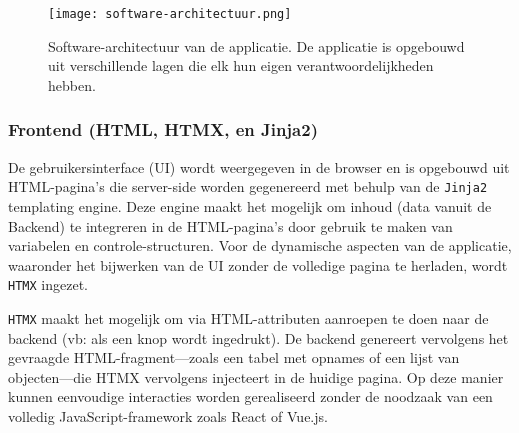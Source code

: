 \begin{figure}[H]
  \centering
  \texttt{[image: software-architectuur.png]}
  \caption[]{\label{fig:software-architectuur} Software-architectuur van de applicatie. De applicatie is opgebouwd uit verschillende lagen die elk hun eigen verantwoordelijkheden hebben. }
\end{figure}

\subsubsection{Frontend (HTML, HTMX, en Jinja2)}

De gebruikersinterface (UI) wordt weergegeven in de browser en is opgebouwd uit HTML-pagina's die server-side worden gegenereerd met behulp van de \texttt{Jinja2} templating engine.
Deze engine maakt het mogelijk om inhoud (data vanuit de Backend) te integreren in de HTML-pagina's door gebruik te maken van variabelen en controle-structuren.
Voor de dynamische aspecten van de applicatie, waaronder het bijwerken van de UI zonder de volledige pagina te herladen, wordt \texttt{HTMX} ingezet.

\texttt{HTMX} maakt het mogelijk om via HTML-attributen aanroepen te doen naar de backend (vb: als een knop wordt ingedrukt).
De backend genereert vervolgens het gevraagde HTML-fragment---zoals een tabel met opnames of een lijst van objecten---die HTMX vervolgens injecteert in de huidige pagina.
Op deze manier kunnen eenvoudige interacties worden gerealiseerd zonder de noodzaak van een volledig JavaScript-framework zoals React of Vue.js.

